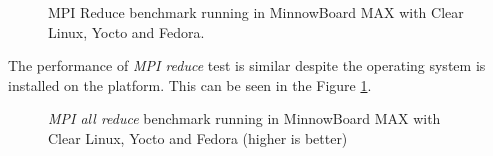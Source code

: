 \begin{figure}[H]
\begin{center}
\end{center}
\caption{MPI Reduce benchmark running in MinnowBoard MAX with Clear Linux, Yocto
and Fedora.}
\label{mpi_reduce_yocto}
\end{figure}

The performance of \textit{MPI reduce} test is similar despite the operating
system is installed on the platform. This can be seen in the Figure
\ref{mpi_reduce_yocto}.

\begin{figure}[H]
\begin{center}
\end{center}
\caption{\textit{MPI all reduce} benchmark running in  MinnowBoard MAX with Clear Linux,
Yocto and Fedora (higher is better)}
\label{mpi_allreduce_yocto}
\end{figure}

